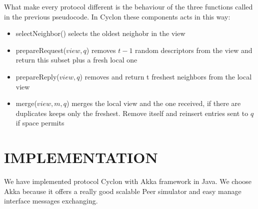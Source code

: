 \documentclass[a4paper,12pt,notitlepage]{article} %
\begin{document}
\begin{algorithm}[H]
\SetAlgoLined
{}

\BlankLine
{}
\BlankLine

\BlankLine

\BlankLine
\end{algorithm}

What make every protocol different is the behaviour of
 the three functions called in the previous pseudocode. In Cyclon these components acts
 in this way:

\begin{itemize}
	\item selectNeighbor() selects the oldest neighobr in the view
	\item prepareRequest(\(view, q\)) removes \(t-1\) random descriptors from the view and return this 
	subset plus a fresh local one
	\item prepareReply(\(view, q\)) removes and return t freshest neighbors from the local view
	\item merge(\(view, m, q\)) merges the local view and the one received, if there are duplicates keeps only the 
	freshest. Remove itself and reinsert entries sent to \(q\) if space permits
\end{itemize}






\section{IMPLEMENTATION}

We have implemented protocol Cyclon with Akka framework in Java.
We choose Akka because it offers a really good scalable Peer simulator and easy manage interface messages exchanging.
\end{document}
